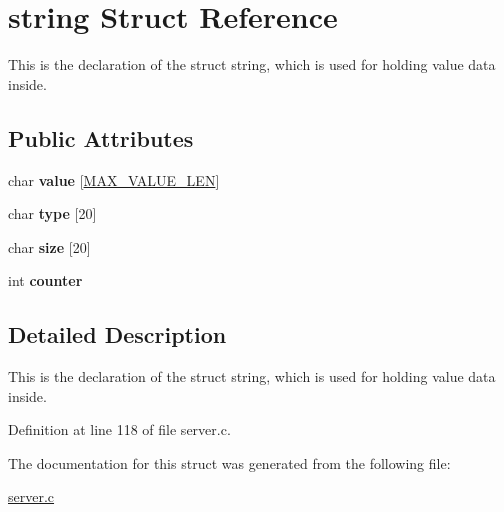 \hypertarget{structstring}{\section{string Struct Reference}
\label{structstring}
}


This is the declaration of the struct string, which is used for holding value data inside.  


\subsection*{Public Attributes}
\begin{DoxyCompactItemize}
\item 
\hypertarget{structstring_a703cba61768ba9205eaadd67b3765050}{char {\bfseries value} \mbox{[}\hyperlink{storage_8h_a00a29850f2b5b985f776f864d83e5ac3}{M\-A\-X\-\_\-\-V\-A\-L\-U\-E\-\_\-\-L\-E\-N}\mbox{]}}\label{structstring_a703cba61768ba9205eaadd67b3765050}

\item 
\hypertarget{structstring_a8c979e5045f70436e666b64636a61c8d}{char {\bfseries type} \mbox{[}20\mbox{]}}\label{structstring_a8c979e5045f70436e666b64636a61c8d}

\item 
\hypertarget{structstring_a444be8d4de7ebc03bcc6f0f4ef9b3726}{char {\bfseries size} \mbox{[}20\mbox{]}}\label{structstring_a444be8d4de7ebc03bcc6f0f4ef9b3726}

\item 
\hypertarget{structstring_a24b1548db3f161875bf8e3afc9ef1d1a}{int {\bfseries counter}}\label{structstring_a24b1548db3f161875bf8e3afc9ef1d1a}

\end{DoxyCompactItemize}


\subsection{Detailed Description}
This is the declaration of the struct string, which is used for holding value data inside. 

Definition at line 118 of file server.\-c.



The documentation for this struct was generated from the following file\-:\begin{DoxyCompactItemize}
\item 
\hyperlink{server_8c}{server.\-c}\end{DoxyCompactItemize}
